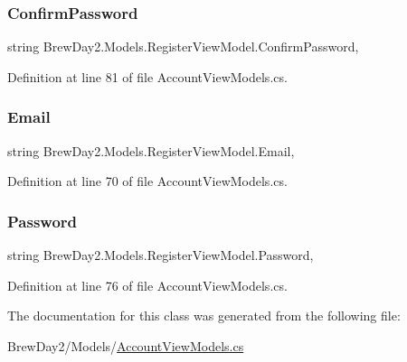 \subsubsection{\texorpdfstring{Confirm\+Password}{ConfirmPassword}}
{\footnotesize\ttfamily string Brew\+Day2.\+Models.\+Register\+View\+Model.\+Confirm\+Password\hspace{0.3cm}{\ttfamily [get]}, {\ttfamily [set]}}



Definition at line 81 of file Account\+View\+Models.\+cs.

\mbox{\label{class_brew_day2_1_1_models_1_1_register_view_model_af51784fc69b4716ef8d0f8ebbec2c205}} 
\subsubsection{\texorpdfstring{Email}{Email}}
{\footnotesize\ttfamily string Brew\+Day2.\+Models.\+Register\+View\+Model.\+Email\hspace{0.3cm}{\ttfamily [get]}, {\ttfamily [set]}}



Definition at line 70 of file Account\+View\+Models.\+cs.

\mbox{\label{class_brew_day2_1_1_models_1_1_register_view_model_aec19deb8733add95af7daca5dc7cc184}} 
\subsubsection{\texorpdfstring{Password}{Password}}
{\footnotesize\ttfamily string Brew\+Day2.\+Models.\+Register\+View\+Model.\+Password\hspace{0.3cm}{\ttfamily [get]}, {\ttfamily [set]}}



Definition at line 76 of file Account\+View\+Models.\+cs.



The documentation for this class was generated from the following file\+:\begin{DoxyCompactItemize}
\item 
Brew\+Day2/\+Models/\mbox{\hyperlink{_account_view_models_8cs}{Account\+View\+Models.\+cs}}\end{DoxyCompactItemize}
